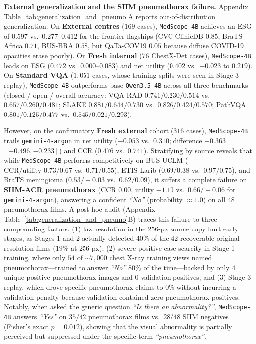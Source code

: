 \documentclass{article} %
\begin{document}
\textbf{External generalization and the SIIM pneumothorax failure.} Appendix Table~\ref{tab:generalization_and_pneumo}A reports out-of-distribution generalization. On \textbf{External centres} ($169$ cases), \texttt{MedScope-4B} achieves an ESG of $0.597$ vs.\ $0.277\text{--}0.412$ for the frontier flagships (CVC-ClinicDB $0.85$, BraTS-Africa $0.71$, BUS-BRA $0.58$, but QaTa-COV19 $0.05$ because diffuse COVID-19 opacities erase poorly). On \textbf{Fresh internal} ($76$ ChestX-Det cases), \texttt{MedScope-4B} leads on ESG ($0.472$ vs.\ $0.000\text{--}0.083$) and net utility ($0.402$ vs.\ $-0.023$ to $0.219$). On \textbf{Standard VQA} ($1,051$ cases, whose training splits were seen in Stage-3 replay), \texttt{MedScope-4B} outperforms base \texttt{Qwen3.5-4B} across all three benchmarks (closed / open / overall accuracy: VQA-RAD $0.741 / 0.230 / 0.514$ vs.\ $0.657 / 0.260 / 0.481$; SLAKE $0.881 / 0.644 / 0.730$ vs.\ $0.826 / 0.424 / 0.570$; PathVQA $0.801 / 0.125 / 0.477$ vs.\ $0.545 / 0.021 / 0.293$).

However, on the confirmatory \textbf{Fresh external} cohort ($316$ cases), \texttt{MedScope-4B} trails \texttt{gemini-4-argon} in net utility ($-0.053$ vs.\ $0.310$; difference $-0.363$ $[-0.496, -0.233]$) and CCR ($0.476$ vs.\ $0.741$). Stratifying by source reveals that while \texttt{MedScope-4B} performs competitively on BUS-UCLM ($\text{CCR/utility } 0.73 / 0.67$ vs.\ $0.71 / 0.55$), ETIS-Larib ($0.69 / 0.38$ vs.\ $0.97 / 0.75$), and BraTS meningioma ($0.53 / -0.03$ vs.\ $0.62 / 0.09$), it suffers a complete failure on \textbf{SIIM-ACR pneumothorax} ($\text{CCR } 0.00$, utility $-1.10$ vs.\ $0.66 / -0.06$ for \texttt{gemini-4-argon}), answering a confident \emph{``No''} (probability $\approx 1.0$) on all $48$ pneumothorax films. A post-hoc audit (Appendix Table~\ref{tab:generalization_and_pneumo}B) traces this failure to three compounding factors: (1) low resolution in the $256\text{-px}$ source copy hurt early stages, as Stages 1 and 2 actually detected $40\%$ of the $42$ recoverable original-resolution films ($19\%$ at $256\text{ px}$); (2) severe positive-case scarcity in Stage-1 training, where only $54$ of $\sim 7,000$ chest X-ray training views named pneumothorax---trained to answer \emph{``No''} $80\%$ of the time---backed by only $4$ unique positive pneumothorax images and $0$ validation positives; and (3) Stage-3 replay, which drove specific pneumothorax claims to $0\%$ without incurring a validation penalty because validation contained zero pneumothorax positives. Notably, when asked the generic question \emph{``Is there an abnormality?''}, \texttt{MedScope-4B} answers \emph{``Yes''} on $35/42$ pneumothorax films vs.\ $28/48$ SIIM negatives (Fisher's exact $p = 0.012$), showing that the visual abnormality is partially perceived but suppressed under the specific term \emph{``pneumothorax''}.
\end{document}
